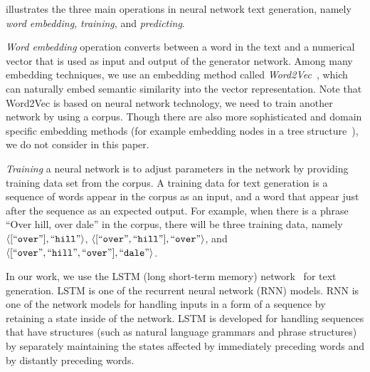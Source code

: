 \documentclass[PRO,english]{ipsj}
\begin{document}
 illustrates the three main operations in neural network text generation, namely \emph{word embedding,} \emph{training}, and \emph{predicting}.

\emph{Word embedding} operation converts between a word in the text and a numerical vector that is used as input and output of the generator network.  Among many embedding techniques, we use an embedding method called \emph{Word2Vec}~\cite{mikolov2013distributed}, which can naturally embed semantic similarity into the vector representation.  Note that Word2Vec is based on neural network technology, we need to train another network by using a corpus.
Though there are also more sophisticated and domain specific embedding methods (for example embedding nodes in a tree structure~\cite{hidehikoasttoken2vec}), we do not consider in this paper.  

\emph{Training} a neural network is to adjust parameters in the network by providing training data set from the corpus.  A training data for text generation is a sequence of words appear in the corpus as an input, and a word that appear just after the sequence as an expected output.  For example, when there is a phrase ``Over hill, over dale'' in the corpus, there will be three training data, namely
$\langle[\mbox{``\texttt{over}''}], \mbox{``\texttt{hill}''}\rangle$, 
$\langle[\mbox{``\texttt{over}''}, \mbox{``\texttt{hill}''}], \mbox{``\texttt{over}''}\rangle$,  and
$\langle[\mbox{``\texttt{over}''}, \mbox{``\texttt{hill}''},\mbox{``\texttt{over}''}], \mbox{``\texttt{dale}''}\rangle$.

In our work, we use the LSTM (long short-term memory) network~\cite{hochreiter1997long} for text generation.  LSTM is one of the recurrent neural network (RNN) models.  RNN is one of the network models for handling inputs in a form of a sequence by retaining a state inside of the network.  LSTM is developed for handling sequences that have structures (such as natural language grammars and phrase structures) by separately maintaining the states affected by immediately preceding words and by distantly preceding words.

\end{document}
